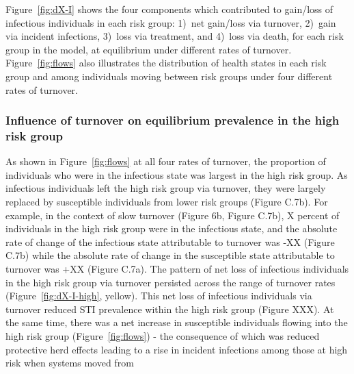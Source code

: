 \par
Figure~\ref{fig:dX-I} shows the four components which contributed to 
gain/loss of infectious individuals in each risk group:
1)~net gain/loss via turnover,
2)~gain via incident infections,
3)~loss via treatment, and
4)~loss via death,
for each risk group in the model,
at equilibrium under different rates of turnover.
Figure~\ref{fig:flows} also illustrates
the distribution of health states in each risk group
and among individuals moving between risk groups
under four different rates of turnover.
\subsubsection{Influence of turnover on equilibrium prevalence in the high risk group}		%
\label{sss:res-prev-high}
As shown in Figure~\ref{fig:flows} at all four rates of turnover,
the proportion of individuals 
who were in the infectious state was largest in the high risk group. 
As infectious individuals left
the high risk group via turnover, they were largely 
replaced by susceptible individuals from lower risk groups (Figure C.7b). 		%
For example, in the context of slow turnover (Figure 6b, Figure C.7b), 			%
X percent of individuals in the high risk group were in the infectious state,
and the absolute rate of change of the infectious state 
attributable to turnover was -XX (Figure C.7b) while the
absolute rate of change in the susceptible state attributable to 
turnover was +XX (Figure C.7a). The pattern of net loss of 
infectious individuals in the high risk group via turnover
persisted across the range of turnover rates (Figure~\ref{fig:dX-I-high}, yellow).			%
This net loss of infectious individuals via turnover 
reduced STI prevalence within the high risk group (Figure XXX). 					%
At the same time, 
there was a net increase in susceptible individuals flowing into the high risk group
(Figure~\ref{fig:flows}) - the consequence of which was reduced protective herd effects
leading to a rise in incident infections among those at high risk when systems moved from 
